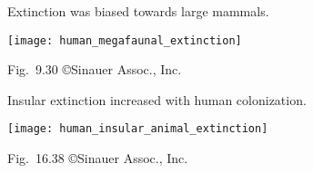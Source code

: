 \documentclass[t]{beamer}
\begin{document}
\begin{frame}[t]{Extinction was biased towards large mammals.}
	\vspace{-\baselineskip}
	\begin{center}
		\texttt{[image: human\_megafaunal\_extinction]}
	\end{center}

	\vfilll
	
	\hfill \tiny Fig.~9.30 \copyright Sinauer Assoc., Inc.
	
\end{frame}
%
\begin{frame}{Insular extinction increased with human colonization.}
	\vspace{-0.5\baselineskip}
	\begin{center}
		\texttt{[image: human\_insular\_animal\_extinction]}
	\end{center}

	\tinyfill Fig.~16.38 \copyright Sinauer Assoc., Inc.

\end{frame}
%
\end{document}
